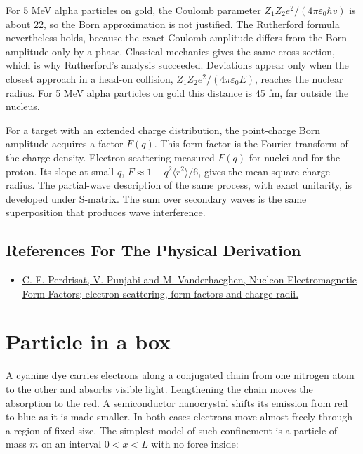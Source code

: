 \documentclass[11pt,oneside]{book}
\begin{document}
For 5 MeV alpha particles on gold, the Coulomb parameter \(Z_1Z_2e^2/(4\pi\varepsilon_0\hbar v)\) is about 22, so the Born approximation is not justified. The Rutherford formula nevertheless holds, because the exact Coulomb amplitude differs from the Born amplitude only by a phase. Classical mechanics gives the same cross-section, which is why Rutherford's analysis succeeded. Deviations appear only when the closest approach in a head-on collision, \(Z_1Z_2e^2/(4\pi\varepsilon_0E)\), reaches the nuclear radius. For 5 MeV alpha particles on gold this distance is 45 fm, far outside the nucleus.

For a target with an extended charge distribution, the point-charge Born amplitude acquires a factor \(F(q)\). This form factor is the Fourier transform of the charge density. Electron scattering measured \(F(q)\) for nuclei and for the proton. Its slope at small \(q\), \(F\approx1-q^2\langle r^2\rangle/6\), gives the mean square charge radius. The partial-wave description of the same process, with exact unitarity, is developed under S-matrix. The sum over secondary waves is the same superposition that produces wave interference.

\subsection*{References For The Physical Derivation}
\begin{itemize}
\item \href{https://arxiv.org/abs/hep-ph/0612014}{C. F. Perdrisat, V. Punjabi and M. Vanderhaeghen, Nucleon Electromagnetic Form Factors; electron scattering, form factors and charge radii.}
\end{itemize}





\clearpage

\section{Particle in a box}

\label{topic:particle-in-a-box}

A cyanine dye carries electrons along a conjugated chain from one nitrogen atom to the other and absorbs visible light. Lengthening the chain moves the absorption to the red. A semiconductor nanocrystal shifts its emission from red to blue as it is made smaller. In both cases electrons move almost freely through a region of fixed size. The simplest model of such confinement is a particle of mass \(m\) on an interval \(0<x<L\) with no force inside:
\end{document}
